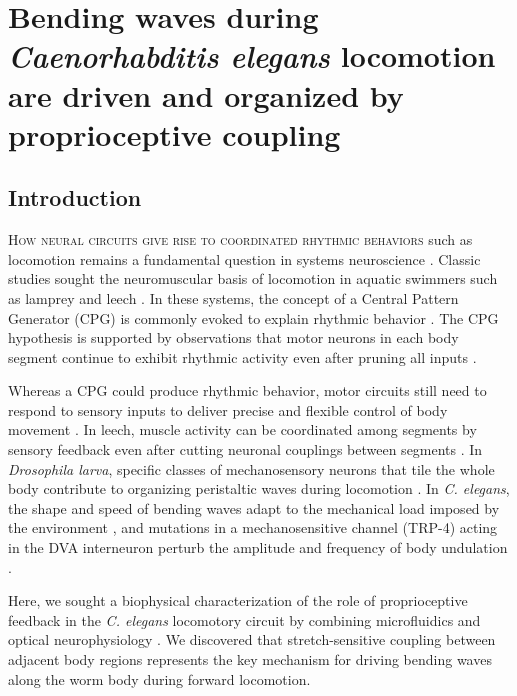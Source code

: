 
\chapter{Bending waves during \textit{Caenorhabditis elegans} locomotion are driven and organized by proprioceptive coupling }


\section{Introduction}
\lettrine{H}{ow neural circuits give rise to coordinated rhythmic behaviors} such as locomotion remains a fundamental question in systems neuroscience 
\citep{delcomyn_neural_1980}. Classic studies sought the neuromuscular 
basis of locomotion in aquatic swimmers such as lamprey and leech \citep{marder_principles_1996,kristan_rhythmic_1976,cohen_neuronal_1980,friesen_neuronal_1978,ermentrout_frequency_1984}. In these systems, the concept of a Central Pattern Generator (CPG) is commonly evoked to explain rhythmic behavior \citep{delcomyn_neural_1980,marder_principles_1996}. The CPG hypothesis is supported by observations that motor neurons in each body segment continue to exhibit rhythmic activity even after pruning all inputs \citep{kristan_rhythmic_1976,cohen_neuronal_1980,pearce_intersegmental_1984}.




Whereas a CPG could produce rhythmic behavior, motor circuits still need to respond to sensory 
inputs to deliver precise and flexible control of body movement \citep{delcomyn_neural_1980}. In leech, muscle activity can be coordinated among segments by sensory feedback even after cutting neuronal couplings between segments \citep{yu_sensory_1999}. In \textit{Drosophila larva}, specific classes of mechanosensory neurons that tile the whole body contribute to organizing peristaltic waves during locomotion \citep{hughes_sensory_2007,song_peripheral_2007,cheng_role_2010}. In \textit{C. 
elegans}, the shape and speed of bending waves adapt to the mechanical load imposed by the 
environment \citep{fang-yen_biomechanical_2010,berri_forward_2009}, and mutations in a mechanosensitive channel (TRP-4) acting in the DVA 
interneuron perturb the amplitude and frequency of body undulation \citep{li_c._2006}.


Here, we sought a biophysical characterization of the role of proprioceptive feedback in the \textit{C. elegans} locomotory circuit by combining microfluidics and optical neurophysiology \citep{liewald_optogenetic_2008,chronis_microfluidics_2007,zhang_multimodal_2007,clark_temporal_2007,lockery_artificial_2008}. We discovered that stretch-sensitive coupling between adjacent body regions represents the key mechanism for driving bending waves along the worm body during forward locomotion.





